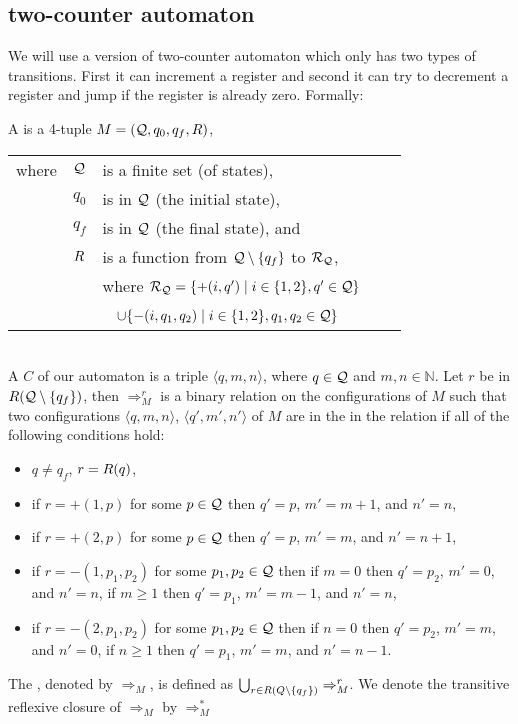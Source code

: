 \subsection{two-counter automaton} %
We will use a version of two-counter automaton which only has two types of transitions. First it can increment a register and second it can try to decrement a register and jump if the register is already zero. Formally:
\begin{definition}
	A  is a 4-tuple $M=(\mathcal{Q},q_0,q_f,R)$,
	\begin{tabular}{llp{0.78\linewidth}}
		where & $\mathcal{Q}$ & is a finite set (of states),                                                                           \\
& $q_0$        & is in $\mathcal{Q}$ (the initial state),                                                                \\
& $q_f$        & is in $\mathcal{Q}$ (the final state), and                                                              \\
& $R$  & is a function from $\mathcal{Q}\setminus\{q_f\}$ to $\mathcal{R}_\autStates$,                           \\
&              & where $\mathcal{R}_{\mathcal{Q}}=\{+(i,q')\mid i\in\{1,2\},q'\in\mathcal{Q}\}$                             \\
&              & ~ \hphantom{where $\mathcal{R}_\autStates$}$\cup\{-(i,q_1,q_2)\mid i\in\{1,2\},q_1,q_2\in\mathcal{Q}\}$ 
	\end{tabular}\\
	A  $C$ of our automaton is a triple $\langle q,m,n\rangle$, where $q\in\mathcal{Q}$ and $m,n\in\mathbb{N}$.
	Let $r$ be in $R(\mathcal{Q}\setminus\{q_f\})$, then $\Rightarrow^r_M$ is a binary relation on the configurations of $M$ such that two configurations $\langle q,m,n\rangle$, $\langle q',m',n'\rangle$ of $M$ are in the in the relation if all of the following conditions hold:
	\begin{itemize}
		\item $q\neq q_f$, $r=R(q)$,
		\item if $r=+(1,p)$ for some $p\in \mathcal{Q}$ then $q'=p$, $m'=m+1$, and $n'=n$,
		\item if $r=+(2,p)$ for some $p\in \mathcal{Q}$ then $q'=p$, $m'=m$, and $n'=n+1$,
		\item if $r=-(1,p_1,p_2)$ for some $p_1,p_2\in \mathcal{Q}$ then
\subitem if $m=0$ then $q'=p_2$, $m'=0$, and $n'=n$,
\subitem if $m\geq1$ then $q'=p_1$, $m'=m-1$, and $n'=n$,
		\item if $r=-(2,p_1,p_2)$ for some $p_1,p_2\in \mathcal{Q}$ then
\subitem if $n=0$ then $q'=p_2$, $m'=m$, and $n'=0$,
\subitem if $n\geq1$ then $q'=p_1$, $m'=m$, and $n'=n-1$.
	\end{itemize}
	The , denoted by $\Rightarrow_M$, is defined as $\bigcup_{r\in R(Q\setminus\{q_f\})}\Rightarrow^r_M$. We denote the transitive reflexive closure of $\Rightarrow_M$ by $\Rightarrow^*_M$
		

\end{definition}
